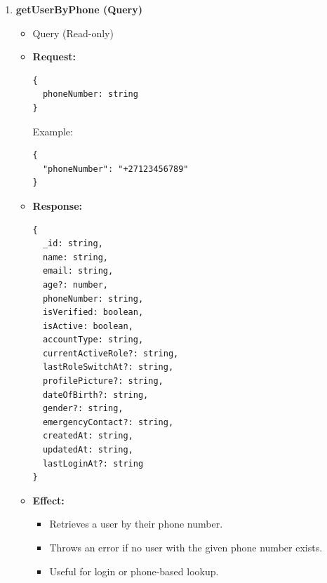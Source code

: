 \documentclass[a4paper,12pt]{article}
\begin{document}
\begin{enumerate}
  \item \textbf{getUserByPhone (Query)}
    \begin{itemize}
      \item Query (Read-only)
      \item \textbf{Request:}
      \begin{verbatim}
{
  phoneNumber: string
}
      \end{verbatim}
      Example:
      \begin{verbatim}
{
  "phoneNumber": "+27123456789"
}
      \end{verbatim}
      \item \textbf{Response:}
      \begin{verbatim}
{
  _id: string,
  name: string,
  email: string,
  age?: number,
  phoneNumber: string,
  isVerified: boolean,
  isActive: boolean,
  accountType: string,
  currentActiveRole?: string,
  lastRoleSwitchAt?: string,
  profilePicture?: string,
  dateOfBirth?: string,
  gender?: string,
  emergencyContact?: string,
  createdAt: string,
  updatedAt: string,
  lastLoginAt?: string
}
      \end{verbatim}
      \item \textbf{Effect:}
      \begin{itemize}
        \item Retrieves a user by their phone number.
        \item Throws an error if no user with the given phone number exists.
        \item Useful for login or phone-based lookup.
      \end{itemize}
    \end{itemize}


\end{enumerate}
\end{document}
